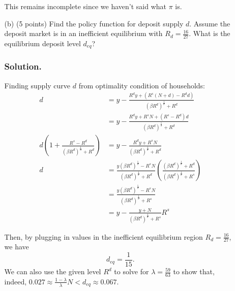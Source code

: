 \documentclass[12pt]{article}
\begin{document}
\begin{enumerate}
\begin{enumerate}
        This remains incomplete since we haven't said what $\pi$ is. 

        
        \item[(b)] {(5 points)} Find the policy function for deposit supply $d$. Assume the deposit market is in an inefficient equilibrium with $R_d = \frac{16}{27}$. What is the equilibrium deposit level $d_{eq}$?
        \subsubsection*{Solution.}

        Finding supply curve $d$ from optimality condition of households: 
        \begin{align*}
             d  &= y - \frac{R^{d}y+(R^s(N+d) - R^d d )}{\left(\beta R^{d}\right)^{\frac{1}{\sigma}}+R^{d}}%
             \\ &= y - \frac{R^{d}y+R^sN +(R^s- R^d) d}{\left(\beta R^{d}\right)^{\frac{1}{\sigma}}+R^{d}}
              \\ d \left(1 + \frac{R^s- R^d}{\left(\beta R^{d}\right)^{\frac{1}{\sigma}}+R^{d}} \right)&= y - \frac{R^{d}y+R^sN}{\left(\beta R^{d}\right)^{\frac{1}{\sigma}}+R^{d}}
               \\  d &= \frac{y\left(\beta R^{d}\right)^{\frac{1}{\sigma}}- R^sN}{\left(\beta R^{d}\right)^{\frac{1}{\sigma}}+R^{d}}\left(\frac{\left(\beta R^{d}\right)^{\frac{1}{\sigma}}+R^{d}}{\left(\beta R^{d}\right)^{\frac{1}{\sigma}} + R^s}\right)
                \\ &= \frac{y\left(\beta R^{d}\right)^{\frac{1}{\sigma}}- R^sN}{\left(\beta R^{d}\right)^{\frac{1}{\sigma}} + R^s}
                 \\ &= y-\frac{y+N}{\left(\beta R^{d}\right)^{\frac{1}{\sigma}}+R^{s}}R^{s}
        \end{align*}

        Then, by plugging in values in the inefficient equilibrium region $R_d = \frac{16}{27}$, we have 
        \[ d_{eq}= \frac{1}{15}. \]
        We can also use the given level $R^d$ to solve for $\lambda = \frac{59}{63}$ to show that, indeed, $ 0.027 \approx \frac{1-\lambda}{\lambda}N < d_{eq} \approx 0.067$.
        

\end{enumerate}
\end{enumerate}
\end{document}
